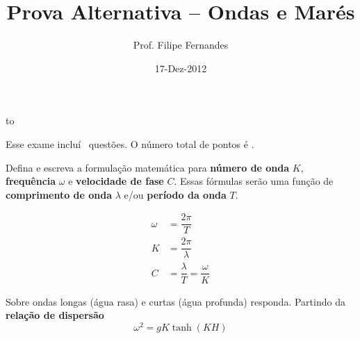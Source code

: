 \documentclass[letterpaper,portuguese,12pt,pdftex]{exam}
\title{Prova Alternativa -- Ondas e Marés}
\author{Prof. Filipe Fernandes}
\date{17-Dez-2012}
\begin{document}
\maketitle
\doublespacing

\vspace{1cm}
\hbox to \textwidth{Nome e número de matrícula:\enspace\hrulefill}
\vspace{1cm}

\begin{minipage}{.8\textwidth}
Esse exame incluí \numquestions\ questões. O número total de pontos é \numpoints.
\end{minipage}

\begin{questions}

\question[2]
  Defina e escreva a formulação matemática para {\bf número de onda} $K$,
  {\bf frequência} $\omega$ e {\bf velocidade de fase} $C$.  Essas fórmulas
  serão uma função de {\bf comprimento de onda} $\lambda$ e/ou {\bf período da
  onda} $T$.

  \begin{solution}
    \begin{align*}
      \omega &= \dfrac{2\pi}{T} \\
      K &= \dfrac{2\pi}{\lambda} \\
      C &= \dfrac{\lambda}{T} = \dfrac{\omega}{K}
    \end{align*}
  \end{solution}

\question
Sobre ondas longas (água rasa) e curtas (água profunda) responda.  Partindo da
{\bf relação de dispersão}
\[
  \omega^2 = gK\tanh(KH)
\]

\end{questions}
\end{document}
